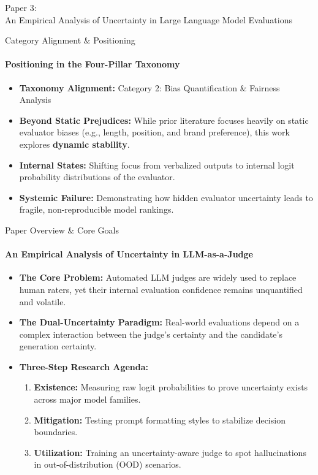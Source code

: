 \documentclass[10pt]{beamer}
\begin{document}
	\begin{frame}[standout]
		\hypertarget{paper3}{}
		\Large Paper 3:\\An Empirical Analysis of Uncertainty in Large Language Model Evaluations
	\end{frame}
	\begin{frame}{Category Alignment \& Positioning}
		\framesubtitle{Positioning in the Four-Pillar Taxonomy}
		\begin{itemize}
			\item \textbf{Taxonomy Alignment:} Category 2: Bias Quantification \& Fairness Analysis
			\item \textbf{Beyond Static Prejudices:} While prior literature focuses heavily on static evaluator biases (e.g., length, position, and brand preference), this work explores \textbf{dynamic stability}.
			\item \textbf{Internal States:} Shifting focus from verbalized outputs to internal logit probability distributions of the evaluator.
			\item \textbf{Systemic Failure:} Demonstrating how hidden evaluator uncertainty leads to fragile, non-reproducible model rankings.
		\end{itemize}
	\end{frame}
	
	\begin{frame}{Paper Overview \& Core Goals}
		\framesubtitle{An Empirical Analysis of Uncertainty in LLM-as-a-Judge}
		\begin{itemize}
			\item \textbf{The Core Problem:} Automated LLM judges are widely used to replace human raters, yet their internal evaluation confidence remains unquantified and volatile.
			\item \textbf{The Dual-Uncertainty Paradigm:} Real-world evaluations depend on a complex interaction between the judge's certainty and the candidate's generation certainty.
			\item \textbf{Three-Step Research Agenda:}
			\begin{enumerate}
				\item \textbf{Existence:} Measuring raw logit probabilities to prove uncertainty exists across major model families.
				\item \textbf{Mitigation:} Testing prompt formatting styles to stabilize decision boundaries.
				\item \textbf{Utilization:} Training an uncertainty-aware judge to spot hallucinations in out-of-distribution (OOD) scenarios.
			\end{enumerate}
		\end{itemize}
	\end{frame}
	
\end{document}

